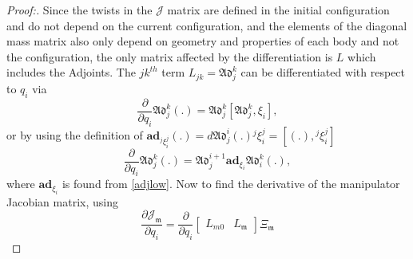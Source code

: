 \documentclass[lettersize,journal]{IEEEtran}
\def \Add {\mathfrak{Ad}}
\theoremstyle{remark}
\begin{document}
\begin{proof}[Proof:]

Since the twists in the $\mathcal{J}$ matrix are defined in the initial configuration and do not depend on the current configuration, and the elements of the diagonal mass matrix also only depend on geometry and properties of each body and not the configuration, the only matrix affected by the differentiation is $L$ which includes the Adjoints. The $jk^{th}$ term $L_{jk}=\Add_j^k$
 can be differentiated with respect to $q_i$ via
\begin{equation}
    \frac{\partial}{\partial q_i}\Add_j^k(.)%
    =\Add_j^k[\Add_j^k,\xi_i],
\end{equation}
or by using the definition of $\textbf{ad}_{{}^j\xi_i^{j}}(.)=d\Add_j^i(.) {}^j\xi_i^{j}=[(.),{}^j\xi_i^{j}]$
\begin{equation}
    \frac{\partial}{\partial q_i}{\Add}_j^k(.)=\Add_j^{i+1}\textbf{ad}_{\xi_i}\Add_i^k(.),
\end{equation}
where $\textbf{ad}_{\xi_i}$ is found from \eqref{adjlow}.
Now to find the derivative of the manipulator Jacobian matrix,
using
\begin{equation}\frac{\partial\mathcal{J}_\mathfrak{m}}{\partial q_i}=\frac{\partial}{\partial q_i}\begin{bmatrix}L_{m0}&L_\mathfrak{m}\end{bmatrix}\Xi_\mathfrak{m} \label{Jdot}\end{equation}

\end{proof}
\end{document}
